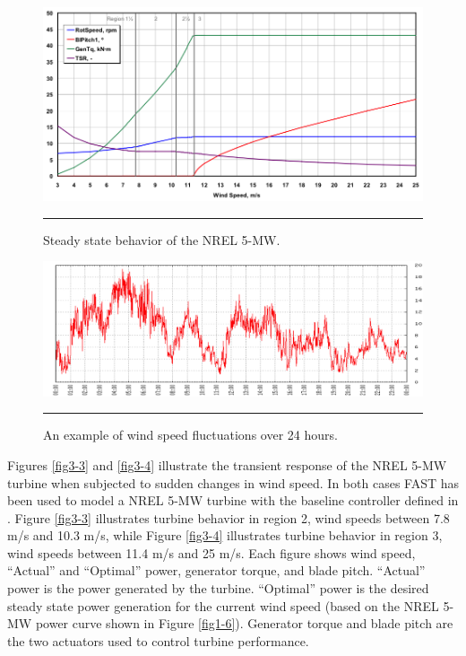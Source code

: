 \begin{figure}[htbp]
	\centering
		\includegraphics[width=\linewidth]{Figures/ch2Figures/fig2-1.png}
		\rule{35em}{0.5pt}
	\caption{Steady state behavior of the NREL 5-MW.\cite{jonkman2009}}
	\label{fig3-1}
\end{figure}

\begin{figure}[htbp]
	\centering
		\includegraphics[width=\linewidth]{Figures/ch3Figures/fig3-2.png}
		\rule{35em}{0.5pt}
	\caption{An example of wind speed fluctuations over 24 hours.\cite{NWTC2013}}
	\label{fig3-2}
\end{figure}

Figures  \ref{fig3-3} and  \ref{fig3-4} illustrate the transient response of the NREL 5-MW turbine when subjected to sudden changes in wind speed. In both cases FAST has been used to model a NREL 5-MW turbine with the baseline controller defined in \cite{jonkman2009}. Figure \ref{fig3-3} illustrates turbine behavior in region 2, wind speeds between 7.8 m/s and 10.3 m/s, while Figure \ref{fig3-4} illustrates turbine behavior in region 3, wind speeds between 11.4 m/s and 25 m/s.  Each figure shows wind speed, “Actual” and “Optimal” power, generator torque, and blade pitch. “Actual” power is the power generated by the turbine. “Optimal” power is the desired steady state power generation for the current wind speed (based on the NREL 5-MW power curve shown in Figure \ref{fig1-6}). Generator torque and blade pitch are the two actuators used to control turbine performance. 

